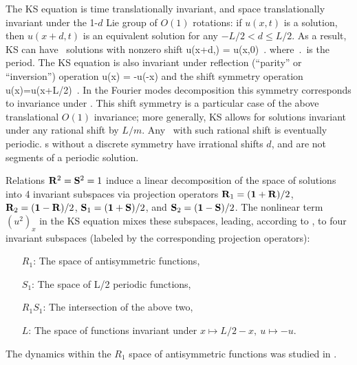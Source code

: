 %
The KS equation   is time translationally invariant,
and 
space translationally invariant
under the 1-$d$ Lie group of $O(1)$ rotations: if
$u(x,t)$ is a solution, then $u(x+d,t)$ is an equivalent
solution for any $-L/2 < d \leq L/2$.
As a result,
KS can have \rpo\ solutions with nonzero shift
\beq
u(x+d,\period{}) = u(x,0)
\,.
where $\period{}$ is the period.
The KS equation is also invariant under
reflection (``parity'' or ``inversion'') operation
\beq
\Refl u(x) = -u(-x)
and the shift symmetry operation 
\beq
\Shift u(x)=u(x+L/2)
\,. 
In the Fourier modes decomposition  this
symmetry corresponds to invariance under
.
This shift symmetry is a particular case of the
above translational $O(1)$ invariance; more generally,
KS allows for solutions invariant under any rational shift by
$L/m$. Any \rpo\ with such rational shift is eventually periodic.
\Rpo s without a discrete symmetry have irrational shifts
$d$, and are not segments of a periodic solution.


Relations $\mathbf{R}^2=\mathbf{S}^2=1$
induce a linear decomposition of the space of solutions into 4 invariant
subspaces via projection operators
$\mathbf{R}_1=(\mathbf 1+\mathbf{R})/2$,
$\mathbf{R}_2=(\mathbf 1-\mathbf{R})/2$,
$\mathbf{S}_1=(\mathbf 1+\mathbf{S})/2$, and
$\mathbf{S}_2=(\mathbf 1-\mathbf{S})/2$. The nonlinear term $(u^2)_x$ in the KS equation
mixes these subspaces, leading,
according to , to four invariant subspaces
(labeled by the corresponding projection operators):
\begin{itemize}
 \item[$R_1$:] The space of antisymmetric functions,
 \item[$S_1$:] The space of L/2 periodic functions,
 \item[$R_1 S_1$:] The intersection of the above two,
 \item[$L$:] The space of functions invariant under $x\mapsto L/2-x,\ u\mapsto -u$.
 
\end{itemize}
The dynamics within the $R_1$ space of antisymmetric functions
was studied in .

